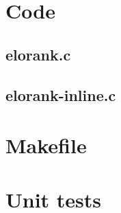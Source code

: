 \begin{scriptsize}
\begin{ttfamily}

\end{ttfamily}
\end{scriptsize}

\section{Code}

\subsection{elorank.c}

\begin{scriptsize}
\begin{ttfamily}

\end{ttfamily}
\end{scriptsize}

\subsection{elorank-inline.c}

\begin{scriptsize}
\begin{ttfamily}

\end{ttfamily}
\end{scriptsize}

\section{Makefile}

\begin{scriptsize}
\begin{ttfamily}

\end{ttfamily}
\end{scriptsize}

\section{Unit tests}

\begin{scriptsize}
\begin{ttfamily}

\end{ttfamily}
\end{scriptsize}

